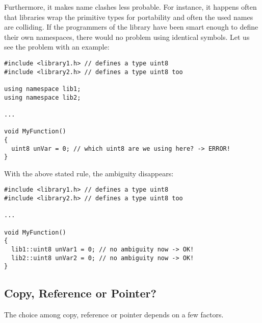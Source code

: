 \documentclass[a4paper]{article}
\begin{document}
Furthermore, it makes name clashes less probable. For instance, it
happens often that libraries wrap the primitive types for portability
and often the used names are colliding. If the programmers of the
library have been smart enough to define their own namespaces, there
would no problem using identical symbols. Let us see the problem with
an example:
%
\begin{lstlisting}
#include <library1.h> // defines a type uint8
#include <library2.h> // defines a type uint8 too

using namespace lib1;
using namespace lib2;

...

void MyFunction()
{
  uint8 unVar = 0; // which uint8 are we using here? -> ERROR!
}
\end{lstlisting}
%
With the above stated rule, the ambiguity disappears:
%
\begin{lstlisting}
#include <library1.h> // defines a type uint8
#include <library2.h> // defines a type uint8 too

...

void MyFunction()
{
  lib1::uint8 unVar1 = 0; // no ambiguity now -> OK!
  lib2::uint8 unVar2 = 0; // no ambiguity now -> OK!
}
\end{lstlisting}

\subsection{Copy, Reference or Pointer?}
\label{subsec:value_reference_pointer}
The choice among copy, reference or pointer depends on a few factors.
\end{document}
